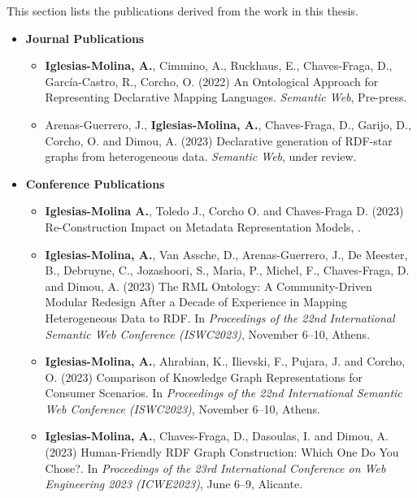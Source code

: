 This section lists the publications derived from the work in this thesis.


\begin{itemize}
    \item \textbf{Journal Publications}
    \begin{itemize}
        \item \textbf{Iglesias-Molina, A.}, Cimmino, A., Ruckhaus, E., Chaves-Fraga, D., García-Castro, R., Corcho, O. (2022) An Ontological Approach for Representing Declarative Mapping Languages. \textit{Semantic Web}, Pre-press. 
    
        \item Arenas-Guerrero, J., \textbf{Iglesias-Molina, A.}, Chaves-Fraga, D., Garijo, D., Corcho, O. and Dimou, A. (2023) Declarative generation of RDF-star graphs from heterogeneous data. \textit{Semantic Web}, under review.
    \end{itemize}
\end{itemize}




\begin{itemize}
    \item \textbf{Conference Publications}
    \begin{itemize}
        \item \textbf{Iglesias-Molina A.}, Toledo J., Corcho O. and Chaves-Fraga D. (2023) Re-Construction Impact on Metadata Representation Models, .
    
        \item \textbf{Iglesias-Molina, A.}, Van Assche, D., Arenas-Guerrero, J., De Meester, B., Debruyne, C., Jozashoori, S., Maria, P., Michel, F., Chaves-Fraga, D. and Dimou, A. (2023) The RML Ontology: A Community-Driven Modular Redesign After a Decade of Experience in Mapping Heterogeneous Data to RDF. In \textit{Proceedings of the 22nd International Semantic Web Conference (ISWC2023)}, November 6--10, Athens.
    
        \item \textbf{Iglesias-Molina, A.}, Ahrabian, K., Ilievski, F., Pujara, J. and Corcho, O. (2023) Comparison of Knowledge Graph Representations for Consumer Scenarios. In \textit{Proceedings of the 22nd International Semantic Web Conference (ISWC2023)}, November 6--10, Athens.
    
        \item \textbf{Iglesias-Molina, A.}, Chaves-Fraga, D., Dasoulas, I. and Dimou, A. (2023) Human-Friendly RDF Graph Construction: Which One Do You Chose?. In \textit{Proceedings of the 23rd International Conference on Web Engineering 2023 (ICWE2023)}, June 6--9, Alicante.
    \end{itemize}
\end{itemize}

